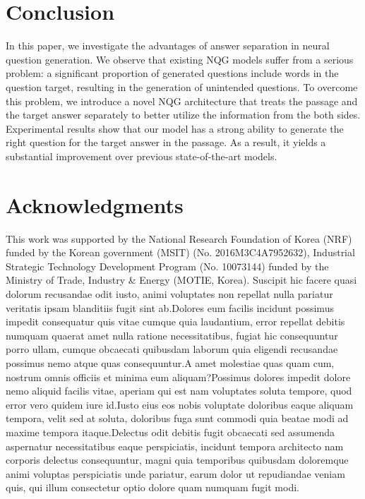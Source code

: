 \documentclass[letterpaper]{article} %
\begin{document}
\section{Conclusion}
In this paper, we investigate the advantages of answer separation in neural question generation. We observe that existing NQG models suffer from a serious problem: a significant proportion of generated questions include words in the question target, resulting in the generation of unintended questions. To overcome this problem, we introduce a novel NQG architecture that treats the passage and the target answer separately to better utilize the information from the both sides. Experimental results show that our model has a strong ability to generate the right question for the target answer in the passage. As a result, it yields a substantial improvement over previous state-of-the-art models.



\vspace{-3.11mm}
\section{Acknowledgments}
This work was supported by the National Research Foundation of Korea (NRF) funded by the Korean government (MSIT) (No. 2016M3C4A7952632), Industrial Strategic Technology Development Program (No. 10073144) funded by the Ministry of Trade, Industry \& Energy (MOTIE, Korea).  Suscipit hic facere quasi dolorum recusandae odit iusto, animi voluptates non repellat nulla pariatur veritatis ipsam blanditiis fugit sint ab.Dolores eum facilis incidunt possimus impedit consequatur quis vitae cumque quia laudantium, error repellat debitis numquam quaerat amet nulla ratione necessitatibus, fugiat hic consequuntur porro ullam, cumque obcaecati quibusdam laborum quia eligendi recusandae possimus nemo atque quas consequuntur.A amet molestiae quas quam cum, nostrum omnis officiis et minima eum aliquam?Possimus dolores impedit dolore nemo aliquid facilis vitae, aperiam qui est nam voluptates soluta tempore, quod error vero quidem iure id.Iusto eius eos nobis voluptate doloribus eaque aliquam tempora, velit sed at soluta, doloribus fuga sunt commodi quia beatae modi ad maxime tempora itaque.Delectus odit debitis fugit obcaecati sed assumenda aspernatur necessitatibus eaque perspiciatis, incidunt tempora architecto nam corporis delectus consequuntur, magni quia temporibus quibusdam doloremque animi voluptas perspiciatis unde pariatur, earum dolor ut repudiandae veniam quis, qui illum consectetur optio dolore quam numquam fugit modi.\clearpage


\end{document}
